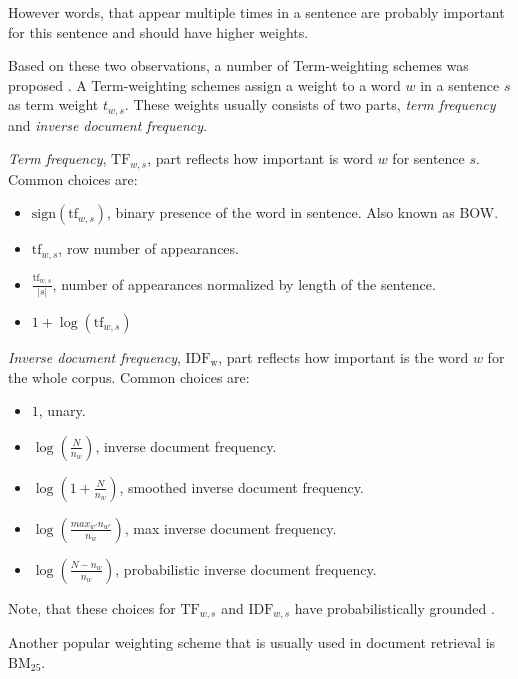         However words, that appear multiple times in a sentence are probably important for this sentence and should have higher weights.
        
        Based on these two observations, a number of Term-weighting schemes was proposed \cite{salton1988term}.
        A Term-weighting schemes assign a weight to a word $w$ in a sentence $s$ as term weight $t_{w,s}$.
        These weights usually consists of two parts, \emph{term frequency} and \emph{inverse document frequency}. 
        
        \emph{Term frequency}, $\mathrm{TF}_{w,s}$, part reflects how important is word $w$ for sentence $s$.
        Common choices are:
        \begin{itemize}
            \item $\mathrm{sign}(\mathrm{tf}_{w,s})$, binary presence of the word in sentence. Also known as BOW.
            \item $\mathrm{tf}_{w,s}$, row number of appearances.
            \item $\frac{\mathrm{tf}_{w,s}}{|s|}$, number of appearances normalized by length of the sentence.
            \item $1+\log(\mathrm{tf}_{w,s})$
        \end{itemize}
        
        \emph{Inverse document frequency}, $\mathrm{IDF_w}$, part reflects how important is the word $w$ for the whole corpus.
        Common choices are:
        \begin{itemize}
            \item $1$, unary.
            \item $\log \left(\frac{N}{n_w} \right)$, inverse document frequency.
            \item $\log \left( 1+\frac{N}{n_w} \right)$, smoothed inverse document frequency.
            \item $\log \left( \frac{max_{w'} n_{w'}}{n_w} \right)$, max inverse document frequency.
            \item $\log \left(\frac{N-n_w}{n_w} \right)$, probabilistic inverse document frequency.
        \end{itemize}

        Note, that these choices for $\mathrm{TF}_{w,s}$ and $\mathrm{IDF}_{w,s}$ have probabilistically grounded \cite{aizawa2003information}. %
        
        Another popular weighting scheme that is usually used in document retrieval is $\mathrm{BM_{25}}$. 
        
